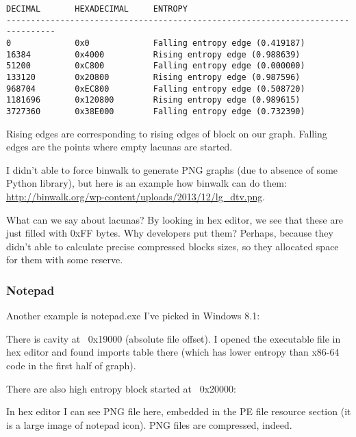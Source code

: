 \begin{lstlisting}
DECIMAL       HEXADECIMAL     ENTROPY
--------------------------------------------------------------------------------
0             0x0             Falling entropy edge (0.419187)
16384         0x4000          Rising entropy edge (0.988639)
51200         0xC800          Falling entropy edge (0.000000)
133120        0x20800         Rising entropy edge (0.987596)
968704        0xEC800         Falling entropy edge (0.508720)
1181696       0x120800        Rising entropy edge (0.989615)
3727360       0x38E000        Falling entropy edge (0.732390)
\end{lstlisting}

Rising edges are corresponding to rising edges of block on our graph.
Falling edges are the points where empty lacunas are started.

I didn't able to force binwalk to generate PNG graphs (due to absence of some Python library), but here is an example how binwalk
can do them: \url{http://binwalk.org/wp-content/uploads/2013/12/lg_dtv.png}.

What can we say about lacunas? By looking in hex editor, we see that these are just filled with 0xFF bytes.
Why developers put them? Perhaps, because they didn't able to calculate precise compressed blocks sizes, so they allocated space
for them with some reserve.

\subsubsection{Notepad}


Another example is notepad.exe I've picked in Windows 8.1:

\begin{figure}[H]
\centering
{}
\end{figure}

There is cavity at ~0x19000 (absolute file offset).
I opened the executable file in hex editor and found imports table there (which has lower entropy than x86-64 code
in the first half of graph).

There are also high entropy block started at ~0x20000:

\begin{figure}[H]
\centering
{}
\end{figure}

In hex editor I can see PNG file here, embedded in the PE file resource section (it is a large image of notepad icon).
PNG files are compressed, indeed.

